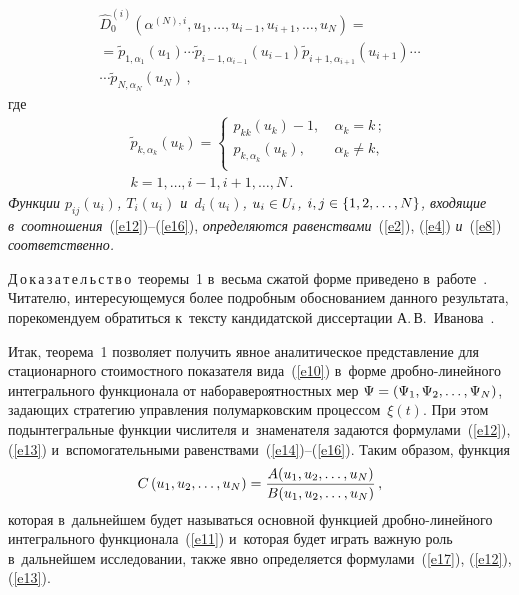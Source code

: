 \begin{multicols}{2}
\noindent
\begin{multline}
{\widehat{D}}_{0}^{(i)}(\alpha ^{(N),i},u_{1}, \ldots ,u_{i-1},u_{i+1},
\ldots , u_{N})={}\\
{} ={\widetilde{p}}_{1,\alpha _{1}}\left(u_{1}\right)\cdots {\widetilde{p}}_{i-1,\alpha
_{i-1}}\left(u_{i-1}\right){\widetilde{p}}_{i+1,\alpha _{i+1}}\left(u_{i+1}\right)\cdots\\
\cdots
{\widetilde{p}}_{N,\alpha _{N}}\left(u_{N}\right)\,, 
\label{e15}
\end{multline}
где
\begin{multline}
 {\widetilde{p}}_{k,\alpha _{k}}(u_{k})=
\begin{cases}
p_{kk}(u_{k})-1,\  & \alpha _{k}=k\,; \\
p_{k,\alpha _{k}}(u_{k}),\  & \alpha _{k}\ne k, \\
\end{cases}\\
 k=1, \ldots , i-1, i+1, \ldots ,N\,. \label{e16}
 \end{multline}
\textit{Функции $p_{ij}(u_i)$, $T_{i}(u_{i})$ и~$d_{i}(u_{i})$,
$u_i\hm\in U_i$, $i,j\hm\in \{1,2,\ldots,N\}$, 
входящие в~соотношения}~(\ref{e12})--(\ref{e16}), 
\textit{определяются равенствами}~(\ref{e2}), (\ref{e4}) \textit{и}~(\ref{e8}) \textit{соответственно.}

\smallskip

\noindent
Д\,о\,к\,а\,з\,а\,т\,е\,л\,ь\,с\,т\,в\,о\ теоремы~1 
в~весьма сжатой форме приведено в~работе~\cite{21}. Читателю, интересующемуся 
более подробным обоснованием данного результата, порекомендуем обратиться к~тексту 
кандидатской диссертации А.\,В.~Иванова~\cite[гл.~3]{22}.

\smallskip

Итак, теорема~1 позволяет получить явное аналитическое представление 
для стационарного стоимостного показателя вида~(\ref{e10}) в~форме 
дроб\-но-ли\-ней\-но\-го интегрального функционала от набора\linebreak вероятностных мер 
$\Psi\hm=(\Psi_{1},\Psi_{2},\ldots , \Psi_{N})$, за\-да\-ющих стратегию управления 
полумарковским процессом~$\xi(t)$. При этом подынтегральные функции числителя 
и~знаменателя задаются формулами~(\ref{e12}), (\ref{e13}) 
и~вспомогательными равенствами~(\ref{e14})--(\ref{e16}). Таким образом, функция
\begin{equation}
C\left(u_1, u_2,\ldots, u_N\right)=\displaystyle\frac{\displaystyle A(u_1, u_2,\ldots, u_N)\mathstrut}{\displaystyle B(u_1, u_2,\ldots, u_N)\mathstrut}\,,
\label{e17}
\end{equation}
которая в~дальнейшем будет называться основной функцией дроб\-но-ли\-ней\-но\-го 
интегрального функционала~(\ref{e11}) и~которая будет играть важную роль 
в~дальнейшем исследовании, также явно определяется формулами~(\ref{e17}), 
(\ref{e12}), (\ref{e13}).


\end{multicols}
